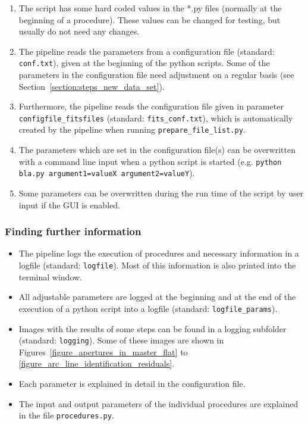 \documentclass[10pt,a4paper]{article}
\begin{document}
\begin{enumerate}
  \item The script has some hard coded values in the *.py files (normally at the beginning of a procedure). These values can be changed for testing, but usually do not need any changes.
  \item The pipeline reads the parameters from a configuration file (standard: \verb|conf.txt|), given at the beginning of the python scripts. Some of the parameters in the configuration file need adjustment on a regular basis (see Section~\ref{section:steps_new_data_set}).
  \item Furthermore, the pipeline reads the configuration file given in parameter \verb|configfile_fitsfiles| (standard: \verb|fits_conf.txt|), which is automatically created by the pipeline when running \verb|prepare_file_list.py|.
  \item The parameters which are set in the configuration file(s) can be overwritten with a command line input when a python script is started (e.g. \verb|python bla.py argument1=valueX argument2=valueY|).
  \item Some parameters can be overwritten during the run time of the script by user input if the GUI is enabled.
\end{enumerate}

\subsubsection{Finding further information}

\begin{itemize}
  \item The pipeline logs the execution of procedures and necessary information in a logfile (standard: \verb|logfile|). Most of this information is also printed into the terminal window.
  \item All adjustable parameters are logged at the beginning and at the end of the execution of a python script into a logfile (standard: \verb|logfile_params|).
  \item Images with the results of some steps can be found in a logging subfolder (standard: \verb|logging|). Some of these images are shown in Figures~\ref{figure_apertures_in_master_flat} to \ref{figure_arc_line_identification_residuals}.
  \item Each parameter is explained in detail in the configuration file.
  \item The input and output parameters of the individual procedures are explained in the file \verb|procedures.py|.
\end{itemize}
\end{document}
